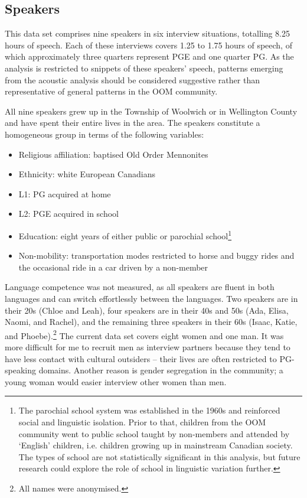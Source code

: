 \documentclass[output=paper]{langscibook}
\begin{document}
\subsection{Speakers}\label{neuhausen:sec:4.2}
This data set comprises nine speakers in six interview situations, totalling 8.25 hours of speech. Each of these interviews covers 1.25 to 1.75 hours of speech, of which approximately three quarters represent \gls*{PGE} and one quarter \gls*{PG}. As the analysis is restricted to snippets of these speakers’ speech, patterns emerging from the acoustic analysis should be considered suggestive rather than representative of general patterns in the \gls*{OOM} community. 

All nine speakers grew up in the Township of Woolwich or in Wellington County and have spent their entire lives in the area. The speakers constitute a homogeneous group in terms of the following variables:
\begin{itemize}
    \item Religious affiliation: baptised Old Order Mennonites
    \item Ethnicity: white European Canadians
    \item L1: \gls*{PG} acquired at home
    \item L2: \gls*{PGE} acquired in school
    \item Education: eight years of either public or parochial school\footnote{The parochial school system was established in the 1960s \citep[41]{epp_mennonites_2012} and reinforced social and linguistic isolation. Prior to that, children from the \gls*{OOM} community went to public school taught by non-members and attended by ‘English’ children, i.e. children growing up in mainstream Canadian society. The types of school are not statistically significant in this analysis, but future research could explore the role of school in linguistic variation further.} 
    \item Non-mobility: transportation modes restricted to horse and buggy rides and the occasional ride in a car driven by a non-member
\end{itemize}


Language competence was not measured, as all speakers are fluent in both languages and can switch effortlessly between the languages. Two speakers are in their 20s (Chloe and Leah), four speakers are in their 40s and 50s (Ada, Elisa, Naomi, and Rachel), and the remaining three speakers in their 60s (Isaac, Katie, and Phoebe).\footnote{All names were anonymised.} The current data set covers eight women and one man. It was more difficult for me to recruit men as interview partners because they tend to have less contact with cultural outsiders – their lives are often restricted to \gls*{PG}-speaking domains. Another reason is gender segregation in the community; a young woman would easier interview other women than men. 
\end{document}
